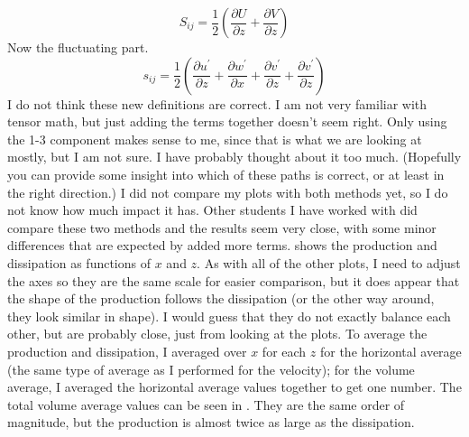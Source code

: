 \documentclass[11pt]{article}
\begin{document}
\begin{enumerate}
\begin{enumerate}
\begin{equation}
			\end{equation}
			\begin{equation}
				S_{ij} = \frac{1}{2} \left( \frac{\partial U}{\partial z} + \frac{\partial V}{\partial z} \right)
			\end{equation}
			Now the fluctuating part.
			\begin{equation}
				s_{ij} = \frac{1}{2} \left( \frac{\partial u^{\prime}}{\partial z} + \frac{\partial w^{\prime}}{\partial x} + \frac{\partial v^{\prime}}{\partial z} + \frac{\partial v^{\prime}}{\partial z} \right)
			\end{equation}
			I do not think these new definitions are correct. I am not very familiar with tensor math, but just adding the terms together doesn't seem right. Only using the 1-3 component makes sense to me, since that is what we are looking at mostly, but I am not sure. I have probably thought about it too much. (Hopefully you can provide some insight into which of these paths is correct, or at least in the right direction.) I did not compare my plots with both methods yet, so I do not know how much impact it has. Other students I have worked with did compare these two methods and the results seem very close, with some minor differences that are expected by added more terms.  shows the production and dissipation as functions of $x$ and $z$. As with all of the other plots, I need to adjust the axes so they are the same scale for easier comparison, but it does appear that the shape of the production follows the dissipation (or the other way around, they look similar in shape). I would guess that they do not exactly balance each other, but are probably close, just from looking at the plots. To average the production and dissipation, I averaged over $x$ for each $z$ for the horizontal average (the same type of average as I performed for the velocity); for the volume average, I averaged the horizontal average values together to get one number. The total volume average values can be seen in . They are the same order of magnitude, but the production is almost twice as large as the dissipation.
			

\end{enumerate}
\end{enumerate}
\end{document}
